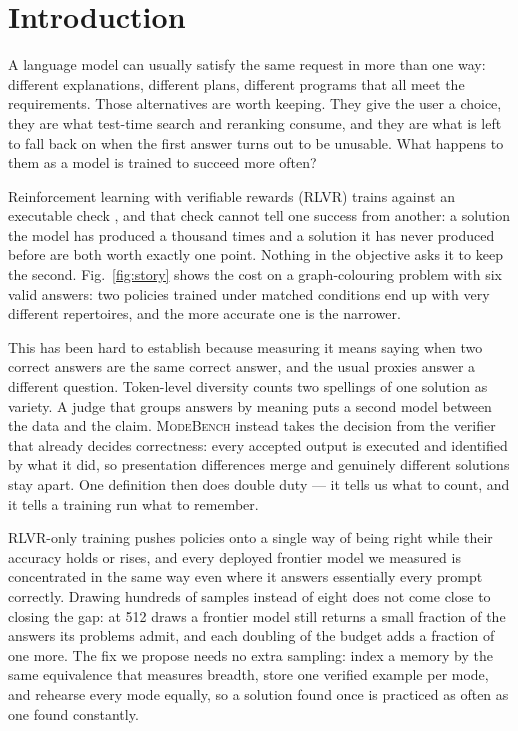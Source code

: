 \documentclass{article}
\newcommand{\1}{\mathbf 1}
\newcommand{\mb}{\textsc{ModeBench}}
\theoremstyle{remark}
\theoremstyle{definition}
\theoremstyle{plain}
\begin{document}
\section{Introduction}
\label{sec:introduction}

A language model can usually satisfy the same request in more than one way:
different explanations, different plans, different programs that all meet the
requirements. Those alternatives are worth keeping. They give the user a choice,
they are what test-time search \citep{brown2024monkeys,snell2024testtime} and
reranking \citep{cobbe2021training,wang2023selfconsistency} consume, and they
are what is left to fall back on when the first answer turns out to be unusable. What happens to
them as a model is trained to succeed more often?

Reinforcement learning with verifiable rewards (RLVR) trains against an
executable check \citep{guo2025deepseekr1}, and that check cannot tell one
success from another: a solution the model has produced a thousand times and a
solution it has never produced before are both worth exactly one point. Nothing
in the objective asks it to keep the second. Fig.~\ref{fig:story} shows the cost
on a graph-colouring problem with six valid answers: two policies trained under
matched conditions end up with very different repertoires, and the more accurate
one is the narrower.

This has been hard to establish because measuring it means saying when two
correct answers are the same correct answer, and the usual proxies answer a
different question. Token-level diversity
\citep{li2016diversity,zhu2018texygen} counts two spellings of one solution as
variety. A judge that groups answers by meaning
\citep{farquhar2024detecting,zheng2023judging} puts a second model between the
data and the claim. \mb{} instead takes the decision from the verifier that
already decides correctness: every accepted output is executed and identified by
what it did, so presentation differences merge and genuinely different
solutions stay apart. One definition then does double duty --- it tells us what
to count, and it tells a training run what to remember.

RLVR-only training pushes
policies onto a single way of being right while their accuracy holds or rises,
and every deployed frontier model we measured is concentrated in the same way
even where it answers essentially every prompt correctly. Drawing hundreds of
samples instead of eight does not come close to closing the gap: at 512 draws a
frontier model still returns a small fraction of the answers its problems
admit, and each doubling of the budget adds a fraction of one more. The fix we
propose needs no extra sampling: index a memory by the same equivalence that
measures breadth, store one verified example per mode, and rehearse every mode
equally, so a solution found once is practiced as often as one found constantly.
\end{document}
